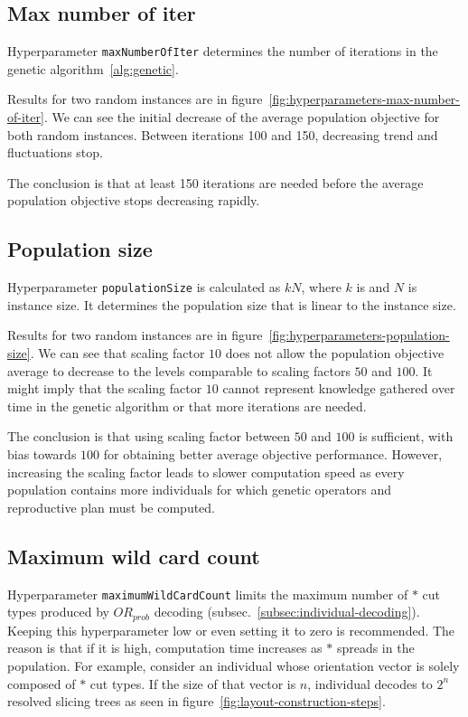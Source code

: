 \subsection{Max number of iter}\label{subsec:max-number-of-iter}
Hyperparameter \verb|maxNumberOfIter| determines the number of iterations in the genetic algorithm~\ref{alg:genetic}.

Results for two random instances are in figure~\ref{fig:hyperparameters-max-number-of-iter}.
We can see the initial decrease of the average population objective for both random instances.
Between iterations 100 and 150, decreasing trend and fluctuations stop.

The conclusion is that at least 150 iterations are needed before the average population objective
stops decreasing rapidly.

\subsection{Population size}\label{subsec:population-size}

Hyperparameter \verb|populationSize| is calculated as $kN$, where $k$ is 
and $N$ is instance size.
It determines the population size that is linear to the instance size.

Results for two random instances are in figure~\ref{fig:hyperparameters-population-size}.
We can see that scaling factor $10$ does not allow
the population objective average to decrease to the levels comparable to scaling factors $50$ and $100$.
It might imply that the scaling factor $10$ cannot represent knowledge gathered over time
in the genetic algorithm or that more iterations are needed.

The conclusion is that using scaling factor between $50$ and $100$ is sufficient, with bias towards $100$
for obtaining better average objective performance.
However, increasing the scaling factor leads to slower computation speed as every population contains
more individuals for which genetic operators and reproductive plan must be computed.

\subsection{Maximum wild card count}\label{subsec:maximum-wild-card-count}
Hyperparameter \verb|maximumWildCardCount| limits the maximum number of $*$ cut types produced by $OR_{prob}$ decoding (subsec.~\ref{subsec:individual-decoding}).
Keeping this hyperparameter low or even setting it to zero is recommended.
The reason is that if it is high, computation time increases as $*$ spreads in the population.
For example, consider an individual whose orientation vector is solely composed of $*$ cut types.
If the size of that vector is $n$, individual decodes to $2^n$ resolved slicing trees as seen in figure~\ref{fig:layout-construction-steps}.

